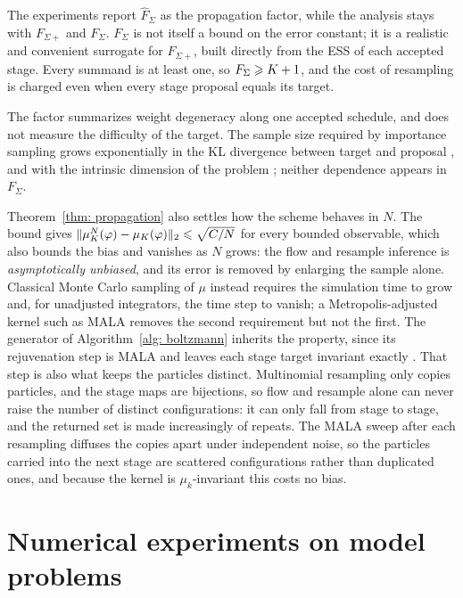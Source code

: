 \documentclass{article}
\begin{document}
The experiments report $\hat F_\Sigma$ as the propagation factor, while the analysis stays with $F_{\Sigma+}$ and $F_\Sigma$. $F_\Sigma$ is not itself a bound on the error constant; it is a realistic and convenient surrogate for $F_{\Sigma+}$, built directly from the ESS of each accepted stage. Every summand is at least one, so $F_\Sigma \geqslant K+1$, and the cost of resampling is charged even when every stage proposal equals its target.

The factor summarizes weight degeneracy along one accepted schedule, and does not measure the difficulty of the target. The sample size required by importance sampling grows exponentially in the KL divergence between target and proposal \citep{chatterjee2018sample}, and with the intrinsic dimension of the problem \citep{agapiou2017importance}; neither dependence appears in $F_\Sigma$.

Theorem~\ref{thm: propagation} also settles how the scheme behaves in $N$. The bound gives $\lVert \mu_K^N(\varphi) - \mu_K(\varphi) \rVert_2 \leqslant \sqrt{C/N}$ for every bounded observable, which also bounds the bias and vanishes as $N$ grows: the flow and resample inference is \emph{asymptotically unbiased}, and its error is removed by enlarging the sample alone. Classical Monte Carlo sampling of $\mu$ instead requires the simulation time to grow and, for unadjusted integrators, the time step to vanish; a Metropolis-adjusted kernel such as MALA removes the second requirement but not the first. The generator of Algorithm~\ref{alg: boltzmann} inherits the property, since its rejuvenation step is MALA and leaves each stage target invariant exactly \citep{delmoral2004feynman}. That step is also what keeps the particles distinct. Multinomial resampling only copies particles, and the stage maps are bijections, so flow and resample alone can never raise the number of distinct configurations: it can only fall from stage to stage, and the returned set is made increasingly of repeats. The MALA sweep after each resampling diffuses the copies apart under independent noise, so the particles carried into the next stage are scattered configurations rather than duplicated ones, and because the kernel is $\mu_k$-invariant this costs no bias.



\section{Numerical experiments on model problems}
\label{sec: experiments}
\end{document}
